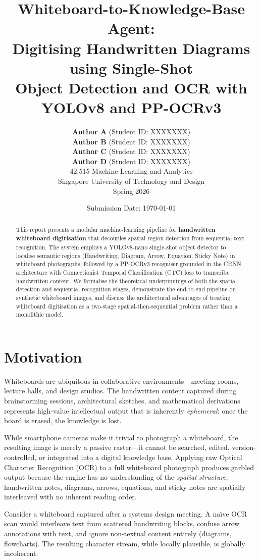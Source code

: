 \documentclass[11pt, a4paper]{article}
\title{
  \textbf{Whiteboard-to-Knowledge-Base Agent:} \\[0.3em]
  \Large Digitising Handwritten Diagrams using Single-Shot \\
  Object Detection and OCR with YOLOv8 and PP-OCRv3
}
\author{
  \textbf{Author A} \quad (Student ID: XXXXXXX) \\
  \textbf{Author B} \quad (Student ID: XXXXXXX) \\
  \textbf{Author C} \quad (Student ID: XXXXXXX) \\
  \textbf{Author D} \quad (Student ID: XXXXXXX) \\[1em]
  \normalsize 42.515 Machine Learning and Analytics \\
  \normalsize Singapore University of Technology and Design \\
  \normalsize Spring 2026
}
\date{Submission Date: \today}
\begin{document}
\maketitle
\begin{abstract}
This report presents a modular machine-learning pipeline for \textbf{handwritten whiteboard digitisation} that decouples spatial region detection from sequential text recognition. The system employs a YOLOv8-nano single-shot object detector to localise semantic regions (Handwriting, Diagram, Arrow, Equation, Sticky Note) in whiteboard photographs, followed by a PP-OCRv3 recogniser grounded in the CRNN architecture with Connectionist Temporal Classification (CTC) loss to transcribe handwritten content. We formalise the theoretical underpinnings of both the spatial detection and sequential recognition stages, demonstrate the end-to-end pipeline on synthetic whiteboard images, and discuss the architectural advantages of treating whiteboard digitisation as a two-stage spatial-then-sequential problem rather than a monolithic model.
\end{abstract}

\tableofcontents
\newpage

\section{Motivation}\label{sec:motivation}

Whiteboards are ubiquitous in collaborative environments—meeting rooms, lecture halls, and design studios. The handwritten content captured during brainstorming sessions, architectural sketches, and mathematical derivations represents high-value intellectual output that is inherently \emph{ephemeral}: once the board is erased, the knowledge is lost.

While smartphone cameras make it trivial to photograph a whiteboard, the resulting image is merely a passive raster—it cannot be searched, edited, version-controlled, or integrated into a digital knowledge base. Applying raw Optical Character Recognition (OCR) to a full whiteboard photograph produces garbled output because the engine has no understanding of the \emph{spatial structure}: handwritten notes, diagrams, arrows, equations, and sticky notes are spatially interleaved with no inherent reading order.

Consider a whiteboard captured after a systems design meeting. A na\"ive OCR scan would interleave text from scattered handwriting blocks, confuse arrow annotations with text, and ignore non-textual content entirely (diagrams, flowcharts). The resulting character stream, while locally plausible, is globally incoherent.
\end{document}

